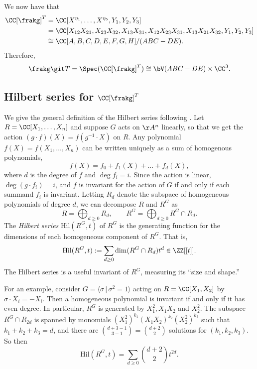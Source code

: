 \documentclass[12pt]{amsart}
\theoremstyle{plain}
\begin{document}
We now have that
\begin{align*}
	\CC[\frakg]^T &= \CC[X^{\eta_1}, \ldots, X^{\eta_5}, Y_1, Y_2, Y_3] \\
	&= \CC[X_{12} X_{21}, X_{23} X_{32}, X_{13} X_{31}, X_{12} X_{23} X_{31}, X_{13} X_{21} X_{32}, Y_1, Y_2, Y_3] \\
	&\cong \CC[A, B, C, D, E, F, G, H]/(ABC - DE).
\end{align*}
Therefore,
$$\frakg \git T = \Spec(\CC[\frakg]^T) \cong \bV(ABC - DE ) \times \CC^3.$$

\subsection{Hilbert series for $\CC[\frakg]^T$}
We give the general definition of the Hilbert series following \cite[\S 1.2]{Mukai03}.
Let $R = \CC[X_1, \ldots, X_n]$ and suppose $G$ acts on $\AA^n$ linearly, so that we get the action $(g\cdot f)(X) = f(g^{-1} \cdot X)$ on $R$.
Any polynomial $f(X) = f(X_1, \ldots, X_n)$ can be written uniquely as a sum of homogenous polynomials,
$$f(X) = f_0 + f_1(X) + \ldots + f_d(X),$$
where $d$ is the degree of $f$ and $\deg f_i = i$.
Since the action is linear, $\deg (g\cdot f_i) = i$, and $f$ is invariant for the action of $G$ if and only if each summand $f_i$ is invariant.
Letting $R_d$ denote the subspace of homogeneous polynomials of degree $d$, we can decompose $R$ and $R^G$ as
$$R = \bigoplus_{d \ge 0} R_d, \qquad R^G = \bigoplus_{d \ge 0} R^G \cap R_d.$$
The \emph{Hilbert series} $\mathrm{Hil}(R^G, t)$ of $R^G$ is the generating function for the dimensions of each homogeneous component of $R^G$.
That is,
$$\mathrm{Hil}(R^G, t):= \sum_{d \ge 0} \dim (R^G \cap R_d) t^d \in \ZZ[[t]].$$
The Hilbert series is a useful invariant of $R^G$, measuring its ``size and shape.''

For an example, consider $G = \langle \sigma \, | \, \sigma^2 = 1\rangle$ acting on $R = \CC[X_1, X_2]$ by $\sigma \cdot X_i = - X_i.$
Then a homogeneous polynomial is invariant if and only if it has even degree.
In particular, $R^G$ is generated by $X_1^2, X_1 X_2$ and $X_2^2$.
The subspace $R^G \cap R_{2d}$ is spanned by monomials $(X_1^2)^{k_1} (X_1 X_2)^{k_2} (X_2^2)^{k_3}$ such that $k_1 + k_2 + k_3 = d$, and there are ${d + 3 - 1 \choose 3 - 1} = {d + 2 \choose 2}$ solutions for $(k_1, k_2, k_3)$.
So then
$$\mathrm{Hil}(R^G, t) = \sum_{d \ge 0} {d + 2 \choose 2} t^{2d}.$$


\newpage
\end{document}
